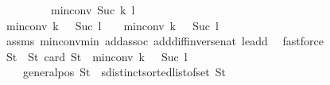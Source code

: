 \begin{isabellebody}
\ \ \ \ \ \ \ \ {\isacharplus}{\kern0pt}\ {\isacharparenleft}{\kern0pt}min{\isacharunderscore}{\kern0pt}conv\ {\isacharparenleft}{\kern0pt}Suc\ {\isacharparenleft}{\kern0pt}k{\isacharplus}{\kern0pt}{}{\isacharparenright}{\kern0pt}{\isacharparenright}{\kern0pt}\ {\isacharparenleft}{\kern0pt}l{\isacharplus}{\kern0pt}{}{\isacharparenright}{\kern0pt}\ {\isacharminus}{\kern0pt}\ {}{\isacharparenright}{\kern0pt}{\isachardoublequoteclose}\isanewline
%
\isadelimproof
%
\endisadelimproof
%
\isatagproof
{}\isamarkupfalse%
{\isacharminus}{\kern0pt}\isanewline
\ \ \isamarkupfalse%
\ {\isachardoublequoteopen}min{\isacharunderscore}{\kern0pt}conv\ {\isacharparenleft}{\kern0pt}k\ {\isacharplus}{\kern0pt}\ {}{\isacharparenright}{\kern0pt}\ {\isacharparenleft}{\kern0pt}Suc\ {\isacharparenleft}{\kern0pt}l\ {\isacharplus}{\kern0pt}\ {}{\isacharparenright}{\kern0pt}{\isacharparenright}{\kern0pt}\ {\isachargreater}{\kern0pt}\ min{\isacharunderscore}{\kern0pt}conv\ {\isacharparenleft}{\kern0pt}k\ {\isacharplus}{\kern0pt}\ {}{\isacharparenright}{\kern0pt}\ {\isacharparenleft}{\kern0pt}Suc\ {\isacharparenleft}{\kern0pt}l\ {\isacharplus}{\kern0pt}\ {}{\isacharparenright}{\kern0pt}{\isacharparenright}{\kern0pt}\ {\isacharminus}{\kern0pt}\ {}{\isachardoublequoteclose}\isanewline
\ \ \ \ \isamarkupfalse%
\ assms{\isacharparenleft}{\kern0pt}{}{\isacharparenright}{\kern0pt}\ min{\isacharunderscore}{\kern0pt}conv{\isacharunderscore}{\kern0pt}min\ add{\isachardot}{\kern0pt}assoc\ add{\isacharunderscore}{\kern0pt}diff{\isacharunderscore}{\kern0pt}inverse{\isacharunderscore}{\kern0pt}nat\ le{\isacharunderscore}{\kern0pt}add{}\ \isamarkupfalse%
\ fastforce\isanewline
\ \ \isamarkupfalse%
\ \isamarkupfalse%
\ S{}t\ \ S{}t{\isacharcolon}{\kern0pt}\ {\isachardoublequoteopen}card\ S{}t\ {\isacharequal}{\kern0pt}\ min{\isacharunderscore}{\kern0pt}conv\ {\isacharparenleft}{\kern0pt}k\ {\isacharplus}{\kern0pt}\ {}{\isacharparenright}{\kern0pt}\ {\isacharparenleft}{\kern0pt}Suc\ {\isacharparenleft}{\kern0pt}l\ {\isacharplus}{\kern0pt}\ {}{\isacharparenright}{\kern0pt}{\isacharparenright}{\kern0pt}\ {\isacharminus}{\kern0pt}\ {}{\isachardoublequoteclose}\ \isanewline
\ \ \ \ {\isachardoublequoteopen}general{\isacharunderscore}{\kern0pt}pos\ S{}t{\isachardoublequoteclose}\ \ {\isachardoublequoteopen}sdistinct{\isacharparenleft}{\kern0pt}sorted{\isacharunderscore}{\kern0pt}list{\isacharunderscore}{\kern0pt}of{\isacharunderscore}{\kern0pt}set\ S{}t{\isacharparenright}{\kern0pt}{\isachardoublequoteclose}\isanewline

\end{isabellebody}
